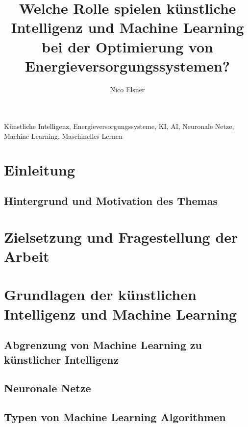 \documentclass[conference]{IEEEtran}
\title{Welche Rolle spielen künstliche Intelligenz und Machine Learning bei der Optimierung von Energieversorgungssystemen?}
\author{
	\IEEEauthorblockN{Nico Elsner}
	\IEEEauthorblockA{
		\textit{Technische Hochschule Ingolstadt} \\
		16. Juni 2023 %
	}
}
\begin{document}

\maketitle
\author{{\Large Nico Elsner}}

\begin{abstract}
	
\end{abstract}

\begin{IEEEkeywords}
	Künstliche Intelligenz, Energieversorgungssysteme, KI, AI, Neuronale Netze, Machine Learning, Maschinelles Lernen
\end{IEEEkeywords}

\section{Einleitung}
\subsection{Hintergrund und Motivation des Themas}

\section{Zielsetzung und Fragestellung der Arbeit}

\section{Grundlagen der künstlichen Intelligenz und Machine Learning}

\subsection{Abgrenzung von Machine Learning zu künstlicher Intelligenz}

\subsection{Neuronale Netze}

\subsection{Typen von Machine Learning Algorithmen}

\end{document}
